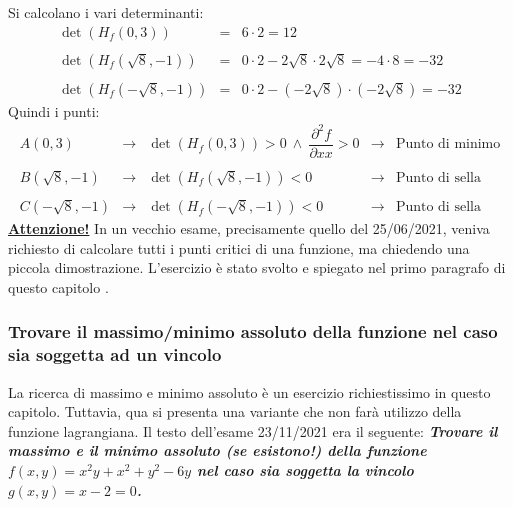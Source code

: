 \documentclass[a4paper]{article}
\begin{document}
	\noindent
	Si calcolano i vari determinanti:
	\begin{equation*}
		\begin{array}{rcl}
			\det\left(H_{f}\left(0,3\right)\right) &=& 6 \cdot 2 = 12 \\
			\\
			\det\left(H_{f}\left(\sqrt{8}, -1\right)\right) &=& 0 \cdot 2 - 2\sqrt{8} \cdot 2\sqrt{8} = - 4 \cdot 8 = -32 \\
			\\
			\det\left(H_{f}\left(-\sqrt{8},-1\right)\right) &=& 0 \cdot 2 - \left(-2\sqrt{8}\right) \cdot \left(-2\sqrt{8}\right) = -32
		\end{array}
	\end{equation*}
	Quindi i punti:
	\begin{equation*}
		\begin{array}{rclcl}
			A\left(0,3\right) &\longrightarrow& \det\left(H_{f}\left(0,3\right)\right) > 0 \: \land \: \dfrac{\partial^{2} f}{\partial xx} > 0 &\longrightarrow& \text{Punto di minimo} \\
			\\
			B\left(\sqrt{8}, -1\right) &\longrightarrow& \det\left(H_{f}\left(\sqrt{8}, -1\right)\right) < 0 &\longrightarrow& \text{Punto di sella} \\
			\\
			C\left(-\sqrt{8}, -1\right) &\longrightarrow& \det\left(H_{f}\left(-\sqrt{8}, -1\right)\right) < 0 &\longrightarrow& \text{Punto di sella} 
		\end{array}
	\end{equation*}
	\textcolor{Red3}{\textbf{\underline{Attenzione!}}} In un vecchio esame, precisamente quello del 25/06/2021, veniva richiesto di calcolare tutti i punti critici di una funzione, ma chiedendo una piccola dimostrazione. L'esercizio è stato svolto e spiegato nel primo paragrafo di questo capitolo \pageref{par: verificare infinità dei punti stazionari di una funzione e trovare il punto di sella}.\newpage

	\subsubsection{Trovare il massimo/minimo assoluto della funzione nel caso sia soggetta ad un vincolo}\label{par: trovare il massimo/minimo assoluto della funzione nel caso sia soggetta ad un vincolo}

	La ricerca di massimo e minimo assoluto è un esercizio richiestissimo in questo capitolo. Tuttavia, qua si presenta una variante che non farà utilizzo della funzione lagrangiana. Il testo dell'esame 23/11/2021 era il seguente: \textcolor{Green4}{\textbf{\emph{Trovare il massimo e il minimo assoluto (se esistono!) della funzione $f\left(x,y\right) = x^{2}y + x^{2} + y^{2} - 6y$ nel caso sia soggetta la vincolo $g\left(x,y\right) = x-2 = 0$.}}}\newline
\end{document}
